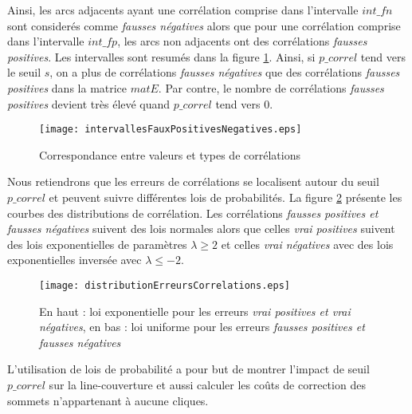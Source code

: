\documentclass[onecolumn, 12pt]{book}
\begin{document}
Ainsi, les arcs adjacents ayant une corr\'elation comprise dans l'intervalle $int\_fn$ sont consider\'es comme {\em fausses n\'egatives} alors que pour une corr\'elation comprise dans l'intervalle $int\_fp$, les arcs non adjacents ont des corr\'elations {\em fausses positives}. 
Les intervalles sont resum\'es dans la figure \ref{intervallesFauxPositivesNegatives}.
Ainsi, si $p\_correl$ tend vers le seuil $s$, on a plus de corr\'elations {\em fausses n\'egatives} que des corr\'elations {\em fausses positives} dans la matrice $matE$. Par contre, le nombre de  corr\'elations {\em fausses positives} devient tr\`es \'elev\'e quand $p\_correl$ tend vers $0$.
\begin{centering} 
\begin{figure}[htb!] 
\texttt{[image: intervallesFauxPositivesNegatives.eps]}
\caption{ Correspondance entre valeurs et types de corr\'elations }
\label{intervallesFauxPositivesNegatives} 
\end{figure}
\end{centering} 
\newline
Nous retiendrons que les erreurs de corr\'elations se localisent autour du seuil $p\_correl$ et peuvent suivre diff\'erentes lois de probabilit\'es. La figure \ref{distributionErreursCorrelations} pr\'esente les courbes des distributions de corr\'elation. Les corr\'elations {\em fausses positives et fausses n\'egatives} suivent des lois normales %
alors que celles {\em vrai positives} suivent des lois exponentielles de param\`etres $\lambda \ge 2$ et celles {\em vrai n\'egatives} avec des lois exponentielles invers\'ee avec $\lambda \le -2$.
\begin{centering} 
\begin{figure}[htb!] 
\texttt{[image: distributionErreursCorrelations.eps]}
\caption{En haut : loi exponentielle pour les erreurs   {\em vrai positives et vrai n\'egatives}, en bas : loi uniforme pour les erreurs   {\em fausses positives et fausses n\'egatives} }
\label{distributionErreursCorrelations} 
\end{figure}
\end{centering}  
\newline
L'utilisation de lois de probabilit\'e a pour but de montrer l'impact de seuil $p\_correl$ sur la line-couverture et aussi calculer les co\^uts de correction des sommets n'appartenant \`a aucune cliques.
\end{document}
